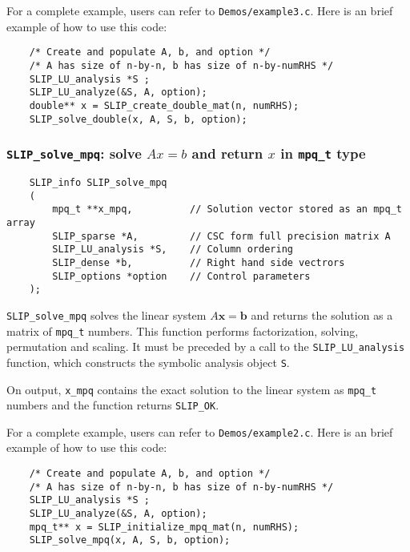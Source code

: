 \documentclass[12pt]{article}
\theoremstyle{definition}
\begin{document}
For a complete example, users can refer to \verb|Demos/example3.c|. Here is an
brief example of how to use this code:

{\small
\begin{verbatim}
    /* Create and populate A, b, and option */
    /* A has size of n-by-n, b has size of n-by-numRHS */
    SLIP_LU_analysis *S ;
    SLIP_LU_analyze(&S, A, option);
    double** x = SLIP_create_double_mat(n, numRHS);
    SLIP_solve_double(x, A, S, b, option);
\end{verbatim}
}

\cprotect\subsubsection{\verb|SLIP_solve_mpq|: solve $Ax=b$ and return $x$ in \verb|mpq_t| type}
\label{ss:SLIP_solve_mpq}

\begin{mdframed}[userdefinedwidth=6in]
{\footnotesize
\begin{verbatim}
    SLIP_info SLIP_solve_mpq
    (
        mpq_t **x_mpq,          // Solution vector stored as an mpq_t array
        SLIP_sparse *A,         // CSC form full precision matrix A
        SLIP_LU_analysis *S,    // Column ordering
        SLIP_dense *b,          // Right hand side vectrors
        SLIP_options *option    // Control parameters
    );
\end{verbatim}
} \end{mdframed}

\verb|SLIP_solve_mpq| solves the linear system $A\mathbf{x}=\mathbf{b}$ and
returns the solution as a matrix of \verb|mpq_t| numbers. This function
performs factorization, solving, permutation and scaling.  It must be preceded
by a call to the \verb|SLIP_LU_analysis| function, which constructs the
symbolic analysis object \verb|S|.

On output, \verb|x_mpq| contains the exact solution to the linear system
as \verb|mpq_t| numbers and the function returns \verb|SLIP_OK|.

For a complete example, users can refer to \verb|Demos/example2.c|. Here is an
brief example of how to use this code:

{\small
\begin{verbatim}
    /* Create and populate A, b, and option */
    /* A has size of n-by-n, b has size of n-by-numRHS */
    SLIP_LU_analysis *S ;
    SLIP_LU_analyze(&S, A, option);
    mpq_t** x = SLIP_initialize_mpq_mat(n, numRHS);
    SLIP_solve_mpq(x, A, S, b, option);
\end{verbatim}
}
\end{document}
